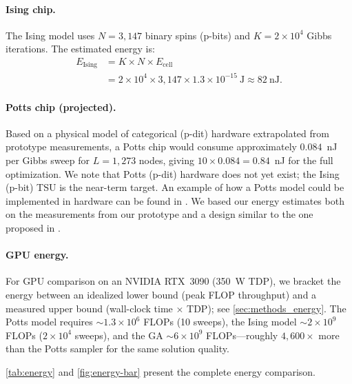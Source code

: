 \documentclass[11pt,twocolumn]{article}
\begin{document}
\paragraph{Ising chip.}
The Ising model uses $N = 3{,}147$ binary spins (p-bits) and $K = 2 \times 10^4$ Gibbs iterations.
The estimated energy is:
\begin{align}
E_\text{Ising} &= K \times N \times E_\text{cell} \nonumber \\
&= 2 \times 10^4 \times 3{,}147 \times 1.3 \times 10^{-15}~\text{J} \approx 82~\text{nJ}.
\end{align}

\paragraph{Potts chip (projected).}
Based on a physical model of categorical (p-dit) hardware extrapolated from prototype measurements, a Potts chip would consume approximately $0.084$~nJ per Gibbs sweep for $L = 1{,}273$ nodes, giving $10 \times 0.084 = 0.84$~nJ for the full optimization.
We note that Potts (p-dit) hardware does not yet exist; the Ising (p-bit) TSU is the near-term target. An example of how a Potts model could be implemented in hardware can be found in \cite{whitehead2023}. We based our energy estimates both on the measurements from our prototype and a design similar to the one proposed in \cite{whitehead2023}.

\paragraph{GPU energy.}
For GPU comparison on an NVIDIA RTX~3090 (350~W TDP), we bracket the energy between an idealized lower bound (peak FLOP throughput) and a measured upper bound (wall-clock time $\times$ TDP); see \cref{sec:methods_energy}.
The Potts model requires ${\sim}1.3 \times 10^6$ FLOPs (10 sweeps), the Ising model ${\sim}2 \times 10^9$ FLOPs ($2 \times 10^4$ sweeps), and the GA ${\sim}6 \times 10^9$ FLOPs---roughly $4{,}600\times$ more than the Potts sampler for the same solution quality.

\cref{tab:energy} and \cref{fig:energy-bar} present the complete energy comparison.
\end{document}
